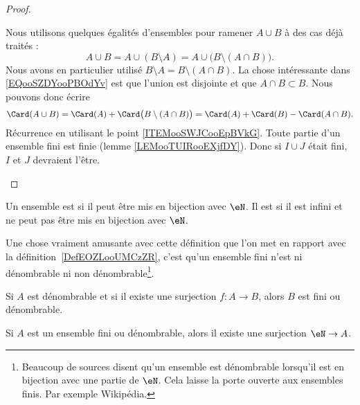 \begin{proof}
\begin{subproof}
		Nous utilisons quelques égalités d'ensembles pour ramener \( A\cup B\) à des cas déjà traités :
		\begin{equation}        \label{EQooSZDYooPBOdYv}
			A\cup B=A\cup(B\setminus A)=A\cup\big( B\setminus(A\cap B) \big).
		\end{equation}
		Nous avons en particulier utilisé \( B\setminus A=B\setminus(A\cap B)\). La chose intéressante dans \eqref{EQooSZDYooPBOdYv} est que l'union est disjointe et que \( A\cap B\subset B\). Nous pouvons donc écrire
		\begin{equation}
			\Card(A\cup B)=\Card(A)+\Card\big( B\setminus(A\cap B) \big)=\Card(A)+\Card(B)-\Card(A\cap B).
		\end{equation}
		Récurrence en utilisant le point \ref{ITEMooSWJCooEpBVkG}.
		Toute partie d'un ensemble fini est finie (lemme \ref{LEMooTUIRooEXjfDY}). Donc si \( I\cup J\) était fini, \( I\) et \( J\) devraient l'être.
	\end{subproof}
\end{proof}


\begin{definition}\label{DefEnsembleDenombrable}
	Un ensemble est  si il peut être mis en bijection avec \( \eN\). Il est  si il est infini et ne peut pas être mis en bijection avec \( \eN\).
\end{definition}
Une chose vraiment amusante avec cette définition que l'on met en rapport avec la définition~\ref{DefEOZLooUMCzZR}, c'est qu'un ensemble fini n'est ni dénombrable ni non dénombrable\footnote{Beaucoup de sources disent qu'un ensemble est dénombrable lorsqu'il est en bijection avec une partie de \( \eN\). Cela laisse la porte ouverte aux ensembles finis. Par exemple Wikipédia\cite{ooLMVKooUiQUtb}.}.

\begin{lemma}       \label{LEMooDTAEooIBdHyo}
	Si \( A\) est dénombrable et si il existe une surjection \( f\colon A\to B\), alors \( B\) est fini ou dénombrable.
\end{lemma}




\begin{lemma}       \label{LEMooSRZWooASgEfy}
	Si \( A\) est un ensemble fini ou dénombrable, alors il existe une surjection \( \eN\to A\).
\end{lemma}

